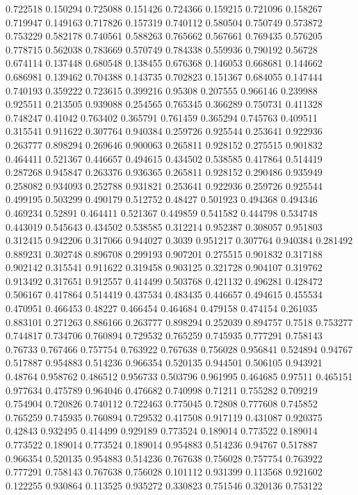 0.722518 0.150294
0.725088 0.151426
0.724366 0.159215
0.721096 0.158267
0.719947 0.149163
0.717826 0.157319
0.740112 0.580504
0.750749 0.573872
0.753229 0.582178
0.740561 0.588263
0.765662 0.567661
0.769435 0.576205
0.778715 0.562038
0.783669 0.570749
0.784338 0.559936
0.790192 0.56728
0.674114 0.137448
0.680548 0.138455
0.676368 0.146053
0.668681 0.144662
0.686981 0.139462
0.704388 0.143735
0.702823 0.151367
0.684055 0.147444
0.740193 0.359222
0.723615 0.399216
0.95308 0.207555
0.966146 0.239988
0.925511 0.213505
0.939088 0.254565
0.765345 0.366289
0.750731 0.411328
0.748247 0.41042
0.763402 0.365791
0.761459 0.365294
0.745763 0.409511
0.315541 0.911622
0.307764 0.940384
0.259726 0.925544
0.253641 0.922936
0.263777 0.898294
0.269646 0.900063
0.265811 0.928152
0.275515 0.901832
0.464411 0.521367
0.446657 0.494615
0.434502 0.538585
0.417864 0.514419
0.287268 0.945847
0.263376 0.936365
0.265811 0.928152
0.290486 0.935949
0.258082 0.934093
0.252788 0.931821
0.253641 0.922936
0.259726 0.925544
0.499195 0.503299
0.490179 0.512752
0.48427 0.501923
0.494368 0.494346
0.469234 0.52891
0.464411 0.521367
0.449859 0.541582
0.444798 0.534748
0.443019 0.545643
0.434502 0.538585
0.312214 0.952387
0.308057 0.951803
0.312415 0.942206
0.317066 0.944027
0.3039 0.951217
0.307764 0.940384
0.281492 0.889231
0.302748 0.896708
0.299193 0.907201
0.275515 0.901832
0.317188 0.902142
0.315541 0.911622
0.319458 0.903125
0.321728 0.904107
0.319762 0.913492
0.317651 0.912557
0.414499 0.503768
0.421132 0.496281
0.428472 0.506167
0.417864 0.514419
0.437534 0.483435
0.446657 0.494615
0.455534 0.470951
0.466453 0.48227
0.466454 0.464684
0.479158 0.474154
0.261035 0.883101
0.271263 0.886166
0.263777 0.898294
0.252039 0.894757
0.7518 0.753277
0.744817 0.734706
0.760894 0.729532
0.765259 0.745935
0.777291 0.758143
0.76733 0.767466
0.757754 0.763922
0.767638 0.756028
0.956841 0.524894
0.94767 0.517887
0.954883 0.514236
0.966354 0.520135
0.944501 0.506105
0.943921 0.48764
0.958762 0.486512
0.956733 0.503796
0.961995 0.464685
0.97511 0.465151
0.977634 0.475789
0.964046 0.476682
0.740998 0.71211
0.755282 0.709219
0.754904 0.720826
0.740112 0.722463
0.775045 0.72808
0.777608 0.745852
0.765259 0.745935
0.760894 0.729532
0.417508 0.917119
0.431087 0.920375
0.42843 0.932495
0.414499 0.929189
0.773524 0.189014
0.773522 0.189014
0.773522 0.189014
0.773524 0.189014
0.954883 0.514236
0.94767 0.517887
0.966354 0.520135
0.954883 0.514236
0.767638 0.756028
0.757754 0.763922
0.777291 0.758143
0.767638 0.756028
0.101112 0.931399
0.113568 0.921602
0.122255 0.930864
0.113525 0.935272
0.330823 0.751546
0.320136 0.753122
